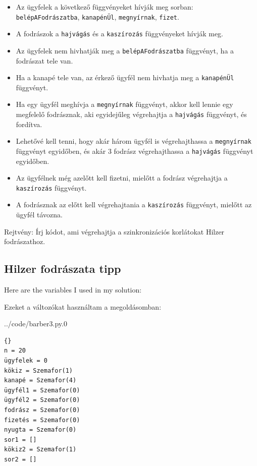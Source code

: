 \documentclass{book}
\begin{document}
\begin{itemize}

\item Az ügyfelek a következő függvényeket hívják meg sorban:
{\tt belépAFodrászatba}, {\tt kanapénÜl}, {\tt megnyírnak}, {\tt fizet}.

\item A fodrászok a {\tt hajvágás} és a {\tt kaszírozás} függvényeket hívják meg.

\item Az ügyfelek nem hivhatják meg a {\tt belépAFodrászatba} függvényt, ha a fodrászat tele van.

\item Ha a kanapé tele van, az érkező ügyfél nem hivhatja meg a {\tt kanapénÜl} függvényt.

\item Ha egy ügyfél meghívja a {\tt megnyírnak} függvényt, akkor kell lennie egy
megfelelő fodrásznak, aki egyidejűleg végrehajtja a {\tt hajvágás} függvényt,
és fordítva.

\item Lehetővé kell tenni, hogy akár három ügyfél is végrehajthassa
a {\tt megnyírnak} függvényt egyidőben, és akár 3 fodrász végrehajthassa a {\tt hajvágás}
függvényt egyidőben.

\item Az ügyfélnek még azelőtt kell fizetni, mielőtt a fodrász végrehajtja
a {\tt kaszírozás} függvényt.

\item A fodrásznak az előtt kell végrehajtania a {\tt kaszírozás} függvényt,
mielőtt az ügyfél távozna.

\end{itemize}

Rejtvény: Írj kódot, ami végrehajtja a szinkronizációs korlátokat Hilzer fodrászathoz.

\subsection{Hilzer fodrászata tipp}

Here are the variables I used in my solution:

Ezeket a változókat használtam a megoldásomban:


{../code/barber3.py.0}

\begin{lstlisting}[title={Hilzer fodrászata tipp}]{}
n = 20
ügyfelek = 0
kökiz = Szemafor(1)
kanapé = Szemafor(4)
ügyfél1 = Szemafor(0)
ügyfél2 = Szemafor(0)
fodrász = Szemafor(0)
fizetés = Szemafor(0)
nyugta = Szemafor(0)
sor1 = []
kökiz2 = Szemafor(1)
sor2 = []
\end{lstlisting}
\end{document}

